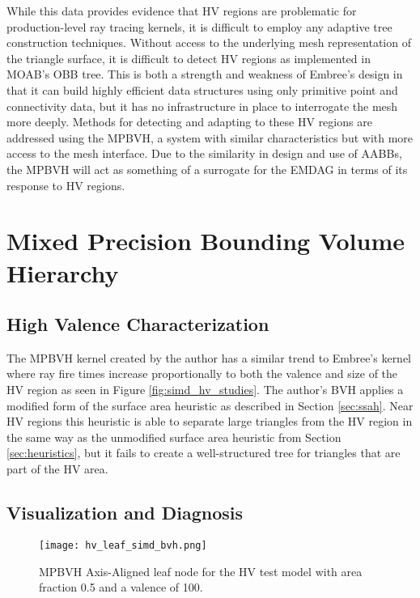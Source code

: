 While this data provides evidence that HV regions are problematic for
production-level ray tracing kernels, it is difficult to employ any adaptive
tree construction techniques. Without access to the underlying mesh
representation of the triangle surface, it is difficult to detect HV regions as
implemented in MOAB's OBB tree. This is both a strength and weakness of Embree's
design in that it can build highly efficient data structures using only
primitive point and connectivity data, but it has no infrastructure in place to
interrogate the mesh more deeply. Methods for detecting and adapting to these HV
regions are addressed using the MPBVH, a system with similar characteristics
but with more access to the mesh interface. Due to the similarity in design and
use of AABBs, the MPBVH will act as something of a surrogate for the EMDAG in
terms of its response to HV regions.

\section{Mixed Precision Bounding Volume Hierarchy}\label{sec:simd_hv_study}

\subsection{High Valence Characterization}

The MPBVH kernel created by the author has a similar trend to Embree's kernel
where ray fire times increase proportionally to both the valence and size of the
HV region as seen in Figure \ref{fig:simd_hv_studies}. The author's BVH applies
a modified form of the surface area heuristic as described in Section
\ref{sec:ssah}. Near HV regions this heuristic is able to separate large
triangles from the HV region in the same way as the unmodified surface area
heuristic from Section \ref{sec:heuristics}, but it fails to create a
well-structured tree for triangles that are part of the HV area.

\subsection{Visualization and Diagnosis}

\begin{figure}
  \centering
  \texttt{[image: hv\_leaf\_simd\_bvh.png]}
  \caption[Axis-aligned bounding box in the high valence region.]{MPBVH
    Axis-Aligned leaf node for the HV test model with area fraction 0.5 and a
    valence of 100.}
  \label{fig:hv_leaf_simd_bvh}
\end{figure}
  

